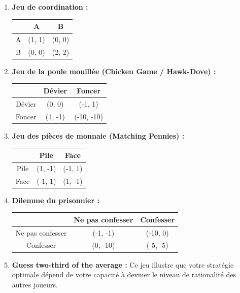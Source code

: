 \begin{enumerate}
    \item \textbf{Jeu de coordination :}
    \begin{center}
    \begin{tabular}{c|c|c}
     & A & B \\ \hline
    A & (1, 1) & (0, 0) \\ \hline
    B & (0, 0) & (2, 2)
    \end{tabular}
    \end{center}

    \item \textbf{Jeu de la poule mouillée (Chicken Game / Hawk-Dove) :}
    \begin{center}
    \begin{tabular}{c|c|c}
     & Dévier & Foncer \\ \hline
    Dévier & (0, 0) & (-1, 1) \\ \hline
    Foncer & (1, -1) & (-10, -10)
    \end{tabular}
    \end{center}

    \item \textbf{Jeu des pièces de monnaie (Matching Pennies) :}
    \begin{center}
    \begin{tabular}{c|c|c}
     & Pile & Face \\ \hline
    Pile & (1, -1) & (-1, 1) \\ \hline
    Face & (-1, 1) & (1, -1)
    \end{tabular}
    \end{center}

    \item \textbf{Dilemme du prisonnier :}
    \begin{center}
    \begin{tabular}{c|c|c}
     & Ne pas confesser & Confesser \\ \hline
    Ne pas confesser & (-1, -1) & (-10, 0) \\ \hline
    Confesser & (0, -10) & (-5, -5)
    \end{tabular}
    \end{center}

    \item \textbf{Guess two-third of the average :}
    Ce jeu illustre que votre stratégie optimale dépend de votre capacité à deviner le niveau de rationalité des autres joueurs.
\end{enumerate}

